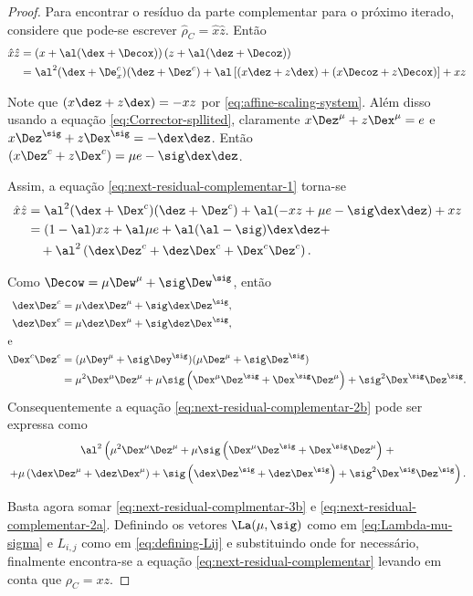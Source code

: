 \begin{proof} 
Para encontrar o resíduo da parte complementar para o próximo iterado,
considere que pode-se escrever
 $\hat{\rho}_C  =
\hat{x}\hat{z}$. Então
\begin{align}
\hat{x}\hat{z} & = \left(x + \al(\dex + \Decox) \right)\left( z + \al(\dez + \Decoz
)\right) \notag \\
& = \al^2(\dex+\De^c_x)(\dez + \Dez^c) +  \al\left[  (x\dez+z\dex) +
(x\Decoz + z\Decox)\right] + xz \label{eq:next-residual-complementar-1}
\end{align}


Note que  $ (x\dez+z\dex) = -xz$ por \eqref{eq:affine-scaling-system}. Além
disso usando a equação \eqref{eq:Corrector-spllited}, claramente  $x\Dez^\mu +
z\Dex^\mu = e$ e $x\Dez^\sig + z\Dex^\sig = - \dex\dez$. Então $(x\Dez^c +
z\Dex^c) = \mu e - \sig\dex\dez$.
 
Assim, a equação \eqref{eq:next-residual-complementar-1} torna-se
\begin{subequations}
\begin{align}
\hat{x}\hat{z} & =  \al^2(\dex + \Dex^c)(\dez + \Dez^c) + \al (-xz + \mu   e
- \sig\dex\dez) + xz \notag\\
& = (1-\al) xz + \al\mu e +
\al(\al-\sig)\dex\dez    +
\label{eq:next-residual-complementar-2a} \\
& \quad + \al^2\left(\dex\Dez^c + \dez\Dex^c + \Dex^c\Dez^c\right).
\label{eq:next-residual-complementar-2b}
\end{align}
\end{subequations}

Como $\Decow = \mu\Dew^\mu + \sig\Dew^\sig$, então
\begin{align*}
\dex\Dez^c &=  \mu\dex\Dez^\mu + \sig\dex\Dez^\sig,\\
\dez\Dex^c &=  \mu\dez\Dex^\mu + \sig\dez\Dex^\sig,\\
\intertext{e}
\Dex^c\Dez^c& =   (\mu\Dey^\mu + \sig\Dey^\sig) (\mu\Dez^\mu
			+ \sig\Dez^\sig) \\ 
			& = \mu^2\Dex^\mu\Dez^\mu + \mu\sig \left(\Dex^\mu\Dez^\sig +
			\Dex^\sig\Dez^\mu \right) + \sig^2\Dex^\sig\Dez^\sig.
\end{align*}
Consequentemente a equação \eqref{eq:next-residual-complementar-2b} pode ser
expressa como
\begin{multline}
\label{eq:next-residual-complmentar-3b}
\al^2\left(\mu^2\Dex^\mu\Dez^\mu + \mu\sig \left(\Dex^\mu\Dez^\sig +
			\Dex^\sig\Dez^\mu \right) \right. +  \\ \left. + \mu\left(\dex\Dez^\mu +
			\dez\Dex^\mu \right) +   \sig\left(\dex\Dez^\sig + \dez\Dex^\sig\right) +
			\sig^2\Dex^\sig\Dez^\sig \right).
\end{multline}


Basta agora somar  \eqref{eq:next-residual-complmentar-3b}  e
 \eqref{eq:next-residual-complementar-2a}. Definindo os vetores
$\La(\mu,\sig)$ como em \eqref{eq:Lambda-mu-sigma} e $L_{i,j}$ como em
\eqref{eq:defining-Lij} e substituindo onde for necessário, finalmente
encontra-se a equação \eqref{eq:next-residual-complementar} levando em conta que $\rho_C = xz$.
\end{proof} 


